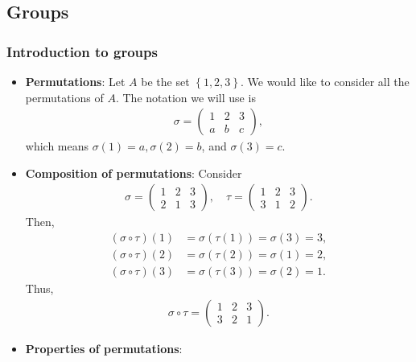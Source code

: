\documentclass{report}
\begin{document}
    \pagebreak 
    \subsection{Groups}
    \subsubsection{Introduction to groups}
    \begin{itemize}
        \item \textbf{Permutations}: Let $A$ be the set $\left\{1,2,3\right\}$. We would like to consider all the permutations of $A$. The notation we will use is
            \begin{align*}
                \sigma = \begin{pmatrix} 1 & 2 & 3 \\ a & b & c \end{pmatrix}
            ,\end{align*}
            which means $\sigma(1) =a, \sigma(2) = b$, and $\sigma(3) = c$.
        \item \textbf{Composition of permutations}: Consider
            \begin{align*}
                \sigma = \begin{pmatrix} 1 & 2 & 3 \\ 2 & 1 & 3 \end{pmatrix}, \quad \tau = \begin{pmatrix} 1 & 2 & 3 \\ 3 & 1 & 2 \end{pmatrix}
            .\end{align*}
            Then,
            \begin{align*}
                (\sigma \circ \tau)(1) &= \sigma(\tau(1)) = \sigma(3) = 3, \\
                (\sigma \circ \tau)(2) &= \sigma(\tau(2)) = \sigma(1) = 2, \\
                (\sigma \circ \tau)(3) &= \sigma(\tau(3)) = \sigma(2) = 1
            .\end{align*}
            Thus,
            \begin{align*}
                \sigma \circ \tau = \begin{pmatrix} 1 & 2 & 3 \\ 3 & 2 & 1 \end{pmatrix}
            .\end{align*}
        \item \textbf{Properties of permutations}: 

\end{itemize}
\end{document}
